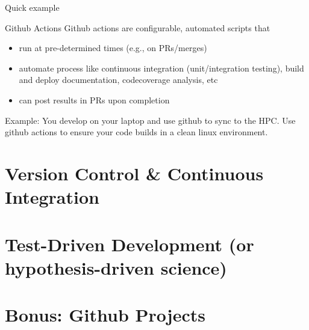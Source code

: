 \documentclass{beamer}
\begin{document}
\begin{frame}{Quick example}
  
\end{frame}

\begin{frame}{Github Actions}
  Github actions are configurable, automated scripts that
  \begin{itemize}
  \item run at pre-determined times (e.g., on PRs/merges)
  \item automate process like continuous integration (unit/integration testing), build and deploy documentation, codecoverage analysis, etc
  \item can post results in PRs upon completion
  \end{itemize}
  \vspace{0.5cm}
  
  Example: You develop on your laptop and use github to sync to the HPC. Use github actions to ensure your code builds in a clean linux environment.
  
  \vspace{0.5cm}
  
  
\end{frame}

\section{Version Control \& Continuous Integration}
\begin{frame}{}
  
\end{frame}

\section{Test-Driven Development (or hypothesis-driven science)}
\begin{frame}{}
  
\end{frame}


\section{Bonus: Github Projects}
\begin{frame}{}
  
\end{frame}
\end{document}
